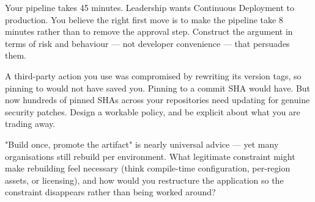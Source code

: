 \begin{thinkbox}
Your pipeline takes 45 minutes. Leadership wants Continuous Deployment to production. You believe the right first move is to make the pipeline take 8 minutes rather than to remove the approval step. Construct the argument in terms of risk and behaviour --- not developer convenience --- that persuades them.
\end{thinkbox}

\begin{thinkbox}
A third-party action you use was compromised by rewriting its version tags, so pinning to  would not have saved you. Pinning to a commit SHA would have. But now hundreds of pinned SHAs across your repositories need updating for genuine security patches. Design a workable policy, and be explicit about what you are trading away.
\end{thinkbox}

\begin{thinkbox}
"Build once, promote the artifact" is nearly universal advice --- yet many organisations still rebuild per environment. What legitimate constraint might make rebuilding feel necessary (think compile-time configuration, per-region assets, or licensing), and how would you restructure the application so the constraint disappears rather than being worked around?
\end{thinkbox}


